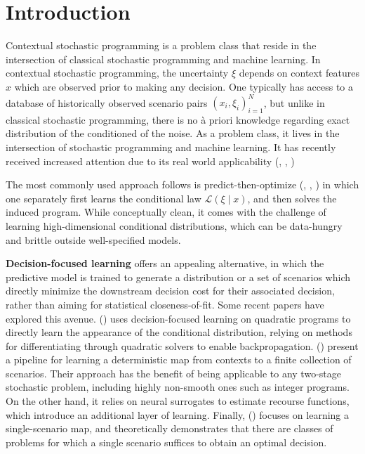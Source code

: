 \documentclass{article}
\begin{document}
\section{Introduction}
Contextual stochastic programming is a problem class that reside in the intersection of classical stochastic programming and machine learning.
In contextual stochastic programming, the uncertainty $\xi$ depends on context features $x$ which are observed prior to making any decision.
One typically has access to a database of historically observed scenario pairs $(x_i, \xi_i)_{i=1}^N$, but unlike in classical stochastic programming, there is no à priori knowledge regarding exact distribution of the conditioned of the noise. 
As a problem class, it lives in the intersection of stochastic programming and machine learning. 
It has recently received increased attention due to its real world applicability (\cite{banBigDataNewsvendor2019}, \cite{dengPredictiveStochasticProgramming2022}, \cite{kannanTechnicalNoteDataDriven2025})

The most commonly used approach follows is predict-then-optimize  (\cite{caoStatisticalInferenceContextual}, \cite{sadanaSurveyContextualOptimization2024}, \cite{tianSolvingContextualStochastic2024})
in which one separately first learns the conditional law $\mathcal{L}(\xi\mid x)$, and then solves the induced program. 
While conceptually clean, it comes with the challenge of learning high-dimensional conditional distributions, which can be data-hungry and brittle outside well-specified models.

\textbf{Decision-focused learning} offers an appealing alternative, in which the predictive model is trained to generate a distribution or a set of scenarios which directly minimize the downstream decision cost for their associated decision, rather than aiming for statistical closeness-of-fit. 
Some recent papers have explored this avenue. 
(\cite{dontiTaskbasedEndtoendModel2019a}) uses decision-focused learning on quadratic programs to directly learn the appearance of the conditional distribution, relying on methods for differentiating through quadratic solvers to enable backpropagation. 
(\cite{islipContextualScenarioGeneration2025}) present a pipeline for learning a deterministic map from contexts to a finite collection of scenarios. 
Their approach has the benefit of being applicable to any two-stage stochastic problem, including highly non-smooth ones such as integer programs. 
On the other hand, it relies on neural surrogates to estimate recourse functions, which introduce an additional layer of learning. 
Finally, (\cite{homem-de-melloForecastingOutsideBox2024}) focuses on learning a single-scenario map, and theoretically demonstrates that there are classes of problems for which a single scenario suffices to obtain an optimal decision.
\end{document}
